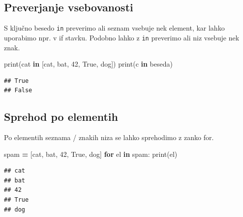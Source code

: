 \documentclass[
]{book}
\newenvironment{Shaded}{\begin{snugshade}}{\end{snugshade}}
\newcommand{\BuiltInTok}[1]{#1}
\newcommand{\ControlFlowTok}[1]{\textcolor[rgb]{0.13,0.29,0.53}{\textbf{#1}}}
\newcommand{\DecValTok}[1]{\textcolor[rgb]{0.00,0.00,0.81}{#1}}
\newcommand{\KeywordTok}[1]{\textcolor[rgb]{0.13,0.29,0.53}{\textbf{#1}}}
\newcommand{\NormalTok}[1]{#1}
\newcommand{\OperatorTok}[1]{\textcolor[rgb]{0.81,0.36,0.00}{\textbf{#1}}}
\newcommand{\StringTok}[1]{\textcolor[rgb]{0.31,0.60,0.02}{#1}}
\newcommand{\VariableTok}[1]{\textcolor[rgb]{0.00,0.00,0.00}{#1}}
\begin{document}
\hypertarget{preverjanje-vsebovanosti}{%
\subsection{Preverjanje vsebovanosti}\label{preverjanje-vsebovanosti}}

S ključno besedo \texttt{in} preverimo ali seznam vsebuje nek element, kar lahko uporabimo npr. v if stavku. Podobno lahko z \texttt{in} preverimo ali niz vsebuje nek znak.

\begin{Shaded}
\begin{Highlighting}[]
\BuiltInTok{print}\NormalTok{(}\StringTok{\textquotesingle{}cat\textquotesingle{}} \KeywordTok{in}\NormalTok{ [}\StringTok{\textquotesingle{}cat\textquotesingle{}}\NormalTok{, }\StringTok{\textquotesingle{}bat\textquotesingle{}}\NormalTok{, }\DecValTok{42}\NormalTok{, }\VariableTok{True}\NormalTok{, }\StringTok{\textquotesingle{}dog\textquotesingle{}}\NormalTok{])}
\BuiltInTok{print}\NormalTok{(}\StringTok{\textquotesingle{}c\textquotesingle{}} \KeywordTok{in} \StringTok{\textquotesingle{}beseda\textquotesingle{}}\NormalTok{)}
\end{Highlighting}
\end{Shaded}

\begin{verbatim}
## True
## False
\end{verbatim}

\hypertarget{sprehod-po-elementih}{%
\subsection{Sprehod po elementih}\label{sprehod-po-elementih}}

Po elementih seznama / znakih niza se lahko sprehodimo z zanko for.

\begin{Shaded}
\begin{Highlighting}[]
\NormalTok{spam }\OperatorTok{=}\NormalTok{ [}\StringTok{\textquotesingle{}cat\textquotesingle{}}\NormalTok{, }\StringTok{\textquotesingle{}bat\textquotesingle{}}\NormalTok{, }\DecValTok{42}\NormalTok{, }\VariableTok{True}\NormalTok{, }\StringTok{\textquotesingle{}dog\textquotesingle{}}\NormalTok{]}
\ControlFlowTok{for}\NormalTok{ el }\KeywordTok{in}\NormalTok{ spam:}
    \BuiltInTok{print}\NormalTok{(el)}
\end{Highlighting}
\end{Shaded}

\begin{verbatim}
## cat
## bat
## 42
## True
## dog
\end{verbatim}
\end{document}
